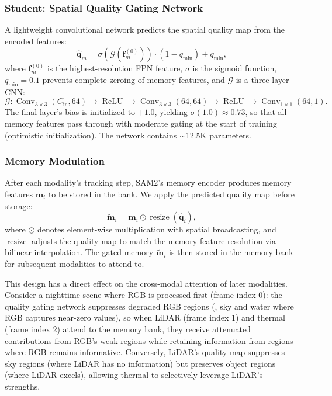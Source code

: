 \subsubsection{Student: Spatial Quality Gating Network}
\label{sec:student}

A lightweight convolutional network predicts the spatial quality map from the encoded features:
\begin{equation}
  \hat{\mathbf{q}}_m = \sigma(\mathcal{G}(\mathbf{f}_m^{(0)})) \cdot (1 - q_\text{min}) + q_\text{min},
  \label{eq:quality_pred}
\end{equation}
where $\mathbf{f}_m^{(0)}$ is the highest-resolution FPN feature, $\sigma$ is the sigmoid function, $q_\text{min} = 0.1$ prevents complete zeroing of memory features, and $\mathcal{G}$ is a three-layer CNN:
\begin{equation}
  \mathcal{G}: \operatorname{Conv}_{3 \times 3}(C_\text{in}, 64) \to \operatorname{ReLU} \to \operatorname{Conv}_{3 \times 3}(64, 64) \to \operatorname{ReLU} \to \operatorname{Conv}_{1 \times 1}(64, 1).
  \label{eq:gating_net}
\end{equation}
The final layer's bias is initialized to $+1.0$, yielding $\sigma(1.0) \approx 0.73$, so that all memory features pass through with moderate gating at the start of training (optimistic initialization).
The network contains ${\sim}$12.5K parameters.

\subsubsection{Memory Modulation}
\label{sec:mem_mod}

After each modality's tracking step, SAM2's memory encoder produces memory features $\mathbf{m}_i$ to be stored in the bank. We apply the predicted quality map before storage:
\begin{equation}
  \tilde{\mathbf{m}}_i = \mathbf{m}_i \odot \operatorname{resize}(\hat{\mathbf{q}}_i),
  \label{eq:mem_mod}
\end{equation}
where $\odot$ denotes element-wise multiplication with spatial broadcasting, and $\operatorname{resize}$ adjusts the quality map to match the memory feature resolution via bilinear interpolation.
The gated memory $\tilde{\mathbf{m}}_i$ is then stored in the memory bank for subsequent modalities to attend to.

This design has a direct effect on the cross-modal attention of later modalities.
Consider a nighttime scene where RGB is processed first (frame index 0):
the quality gating network suppresses degraded RGB regions (\eg, sky and water where RGB captures near-zero values), so when LiDAR (frame index 1) and thermal (frame index 2) attend to the memory bank, they receive attenuated contributions from RGB's weak regions while retaining information from regions where RGB remains informative.
Conversely, LiDAR's quality map suppresses sky regions (where LiDAR has no information) but preserves object regions (where LiDAR excels), allowing thermal to selectively leverage LiDAR's strengths.


